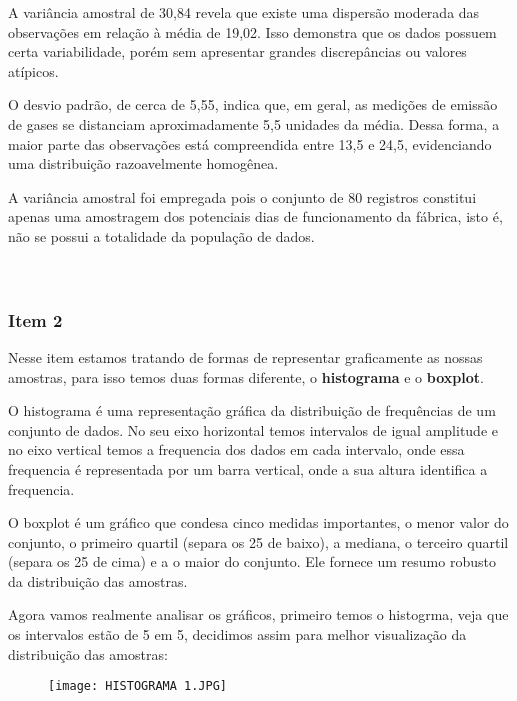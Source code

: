 \documentclass[a4paper,11pt]{article}
\begin{document}
A variância amostral de 30,84 revela que existe uma dispersão moderada das observações em relação à média de 19,02. Isso demonstra que os dados possuem certa variabilidade, porém sem apresentar grandes discrepâncias ou valores atípicos.

O desvio padrão, de cerca de 5,55, indica que, em geral, as medições de emissão de gases se distanciam aproximadamente 5,5 unidades da média. Dessa forma, a maior parte das observações está compreendida entre 13,5 e 24,5, evidenciando uma distribuição razoavelmente homogênea. 

A variância amostral foi empregada pois o conjunto de 80 registros constitui
apenas uma amostragem dos potenciais dias de funcionamento da fábrica, isto é, não se possui a totalidade da população de dados.
\\
\\
\\

\subsubsection{Item 2}

Nesse item estamos tratando de formas de representar graficamente as nossas amostras, para isso temos duas formas diferente, o \textbf{histograma} e o \textbf{boxplot}.

O histograma é uma representação gráfica da distribuição de frequências de um conjunto de dados. No seu eixo horizontal temos intervalos de igual amplitude e no eixo vertical temos a frequencia dos dados em cada intervalo, onde essa frequencia é representada por um barra vertical, onde a sua altura identifica a frequencia.

O boxplot é um gráfico que condesa cinco medidas importantes, o menor valor do conjunto, o primeiro quartil (separa os 25 de baixo), a mediana, o terceiro quartil (separa os 25 de cima) e a o maior do conjunto. Ele fornece um resumo robusto da distribuição das amostras.

Agora vamos realmente analisar os gráficos, primeiro temos o histogrma, veja que os intervalos estão de 5 em 5, decidimos assim para melhor visualização da distribuição das amostras:

\begin{figure}[h]
    \centering
    \texttt{[image: HISTOGRAMA 1.JPG]}
    \caption{}
    \label{fig:placeholder}
\end{figure}
\\
\\
\end{document}
